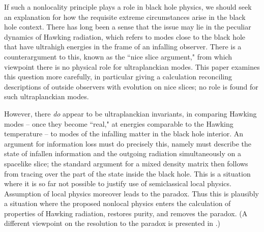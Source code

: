 If such a nonlocality principle plays a role in black hole physics, we should seek an explanation for how the requisite extreme circumstances arise in the black hole context.  There has long been a sense that the issue may lie in the peculiar dynamics of Hawking radiation\Hawkevap, which refers to modes close to the black hole that have ultrahigh energies in the frame of an infalling observer.  There is a counterargument to this, known as the ``nice slice argument,"
from which viewpoint there is no physical role for ultraplanckian modes.  This paper examines this question more carefully, in particular giving a calculation reconciling descriptions of outside observers with evolution on nice slices;   no role is found for  such ultraplanckian modes. 

However, there {\it do} appear to be ultraplanckian invariants, in comparing Hawking modes -- once they become ``real," at energies  comparable to the Hawking temperature -- to modes of the infalling matter in the black hole interior.  An argument for information loss must do precisely this, namely must describe the state  of infallen information and the outgoing radiation simultaneously on a spacelike slice; the standard argument for a mixed density matrix then follows from tracing over the part of the state inside  the black hole.  This is a situation where it is so far not possible to justify use of semiclassical local physics.  Assumption of local physics moreover leads to the paradox.  Thus this is plausibly a situation where the proposed nonlocal physics enters the calculation of properties of Hawking radiation, restores purity, and removes the paradox.  (A different viewpoint on the resolution to the paradox is presented in .)


